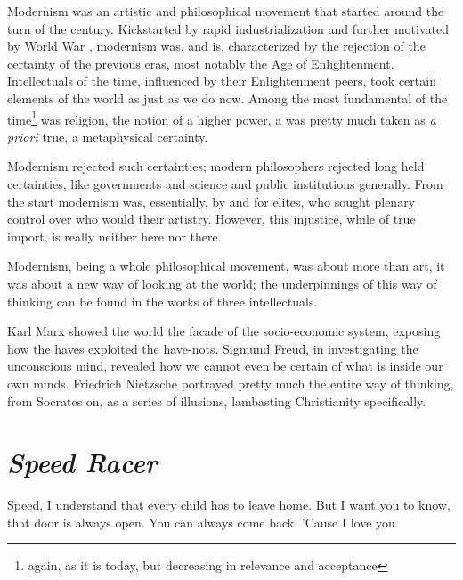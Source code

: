\documentclass[../butidigress.tex]{subfiles}
\newcounter{worldwarcounter}\setcounter{worldwarcounter}{1}
\begin{document}
Modernism was an artistic and philosophical movement that started around the turn of the  century.
Kickstarted by rapid industrialization and further motivated by World War , modernism was, and is, characterized by the rejection of the certainty of the previous eras, most notably the Age of Enlightenment.
Intellectuals of the time, influenced by their Enlightenment peers, took certain elements of the world as  just as we do now.
Among the most fundamental of the time\footnote{again, as it is today, but decreasing in relevance and acceptance} was religion, the notion of a higher power, a  was pretty much taken as \textit{a priori} true, a metaphysical certainty.

Modernism rejected such certainties; modern philosophers rejected long held certainties, like governments and science and public institutions generally.
From the start modernism was, essentially, by and for elites\autocite[2]{cambridgemodern}, who sought plenary control over who would  their artistry.
However, this injustice, while of true import, is really neither here nor there.

Modernism, being a whole philosophical movement, was about more than art, it was about a new way of looking at the world; the underpinnings of this way of thinking can be found in the works of three intellectuals\autocite[9]{cambridgemodern}.

Karl Marx showed the world the facade of the socio-economic system, exposing how the haves exploited the have-nots.
Sigmund Freud, in investigating the unconscious mind, revealed how we cannot even be certain of what is inside our own minds.
Friedrich Nietzsche portrayed pretty much the entire  way of thinking, from Socrates on, as a series of illusions, lambasting Christianity specifically.


\section{\textit{Speed Racer}}
\epigraph{Speed, I understand that every child has to leave home. But I want you to know, that door is always open. You can always come back. 'Cause I love you.}{}
\end{document}
